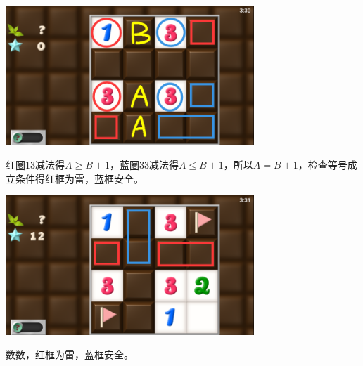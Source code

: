 \subsection{} %
\begin{center}
    \includegraphics[width=0.7\textwidth]{puzzle/158-1.png}
\end{center}
红圈13减法得$A\ge B+1$，蓝圈33减法得$A\le B+1$，所以$A=B+1$，检查等号成立条件得红框为雷，蓝框安全。
\begin{center}
    \includegraphics[width=0.7\textwidth]{puzzle/158-2.png}
\end{center}
数数，红框为雷，蓝框安全。

